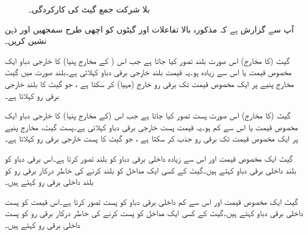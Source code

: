 \begin{figure}
\centering
{}
\caption{بلا شرکت جمع گیٹ کی کارکردگی۔}
\label{شکل_بوولین_بلاشرکت_کارکردگی}
\end{figure}

آپ  سے گزارش  ہے کہ مذکورہ بالا تفاعلات اور گیٹوں کو اچھی طرح سمجھیں اور ذہن نشین کریں۔



گیٹ  (کا  مخارج)   اس صورت بلند تصور کیا جاتا ہے جب اس  ( کے مخارج پنیا) کا    خارجی دباو  ایک مخصوص قیمت  یا اس سے زیادہ  ہو۔یہ قیمت    بلند خارجی برقی دباو     کہلاتی ہے۔بلند صورت میں گیٹ  مخارج پنیے پر  ایک مخصوص قیمت  تک برقی رو خارج (مہیا)  کر سکتا ہے ، جو گیٹ کا  بلند خارجی برقی رو    کہلاتا ہے۔

گیٹ (کا مخارج)  اس صورت پست تصور کیا جاتا ہے جب اس (کے مخارج پنیا) کا خارجی دباو  ایک مخصوص قیمت  یا اس سے کم  ہو۔یہ  قیمت پست  خارجی برقی دباو    کہلاتی ہے۔پست   گیٹ،   مخارج پنیے پر  ایک مخصوص قیمت  تک برقی رو جذب   کر سکتا ہے ، جو گیٹ کا  پست خارجی    برقی رو    کہلاتا ہے۔

	
گیٹ ایک مخصوص  قیمت  اور اس سے زیادہ داخلی برقی دباو کو بلند تصور کرتا ہے۔اس برقی دباو کو بلند داخلی برقی دباو   کہتے ہیں۔گیٹ کے کسی ایک مداخل کو بلند کرنے کی خاطر درکار برقی رو کو بلند داخلی برقی رو    کہتے ہیں۔

گیٹ ایک مخصوص قیمت اور اس سے کم داخلی برقی دباو کو پست تصور کرتا ہے۔اس قیمت  کو پست داخلی برقی دباو    کہتے ہیں۔گیٹ کے کسی ایک مداخل کو پست کرنے کی خاطر درکار برقی رو کو پست داخلی برقی رو   کہتے ہیں۔
	
